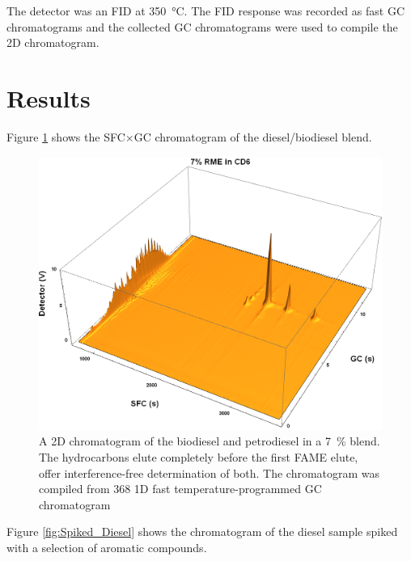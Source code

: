 The detector was an FID at \SI{350}{\celsius}. The FID response was recorded as
fast GC chromatograms and the collected GC chromatograms were used to compile
the 2D chromatogram.

\section{Results}

Figure \ref{fig:PAH_FAMEs} shows the SFC×GC chromatogram of the diesel/biodiesel blend.

\begin{figure}
	\centering
	\includegraphics[width=\textwidth]{Figures/PAH_FAMEs.png}
	\decoRule	
	
\caption[Biodiesel separated from petrodiesel.]{A 2D chromatogram of the
biodiesel and petrodiesel in a \SI{7}{\percent} blend. The hydrocarbons elute
completely before the first FAME elute, offer interference-free determination of
both. The chromatogram was compiled from \num{368} 1D fast temperature-programmed GC
chromatogram}

	\label{fig:PAH_FAMEs} 
\end{figure}

Figure \ref{fig:Spiked_Diesel} shows the chromatogram of the diesel sample spiked with a selection of aromatic compounds. 

